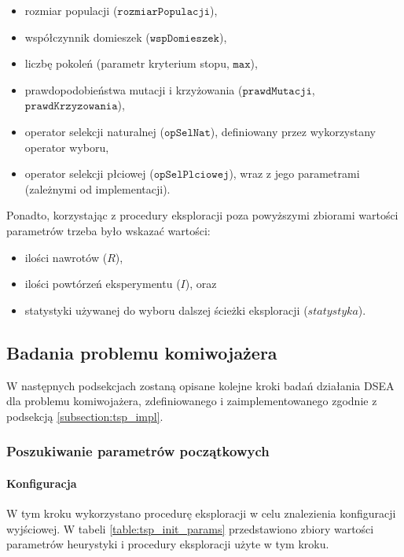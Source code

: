 \documentclass[twoside]{iisthesis}
\newcommand{\param}[1]{\mathtt{#1}}
\begin{document}
\begin{itemize}
	\item rozmiar populacji ($\param{rozmiarPopulacji}$),
	\item współczynnik domieszek ($\param{wspDomieszek}$),
	\item liczbę pokoleń (parametr kryterium stopu, $\param{max}$),
	\item prawdopodobieństwa mutacji i krzyżowania ($\param{prawdMutacji}$, $\param{prawdKrzyzowania}$),
	\item operator selekcji naturalnej ($\param{opSelNat}$), definiowany przez wykorzystany operator wyboru,
	\item operator selekcji płciowej ($\param{opSelPlciowej}$), wraz z jego parametrami (zależnymi od implementacji).
\end{itemize}

Ponadto, korzystając z procedury eksploracji poza powyższymi zbiorami wartości parametrów trzeba było wskazać wartości:

\begin{itemize}
	\item ilości nawrotów ($R$),
	\item ilości powtórzeń eksperymentu ($I$), oraz
	\item statystyki używanej do wyboru dalszej ścieżki eksploracji ($statystyka$).
\end{itemize}

\subsection{Badania problemu komiwojażera}

W następnych podsekcjach zostaną opisane kolejne kroki badań działania DSEA dla problemu komiwojażera, zdefiniowanego i zaimplementowanego zgodnie z podsekcją \ref{subsection:tsp_impl}.

\subsubsection{Poszukiwanie parametrów początkowych}

\paragraph{Konfiguracja}

W tym kroku wykorzystano procedurę eksploracji w celu znalezienia konfiguracji wyjściowej. W tabeli \ref{table:tsp_init_params} przedstawiono zbiory wartości parametrów heurystyki i procedury eksploracji użyte w tym kroku.
\end{document}
